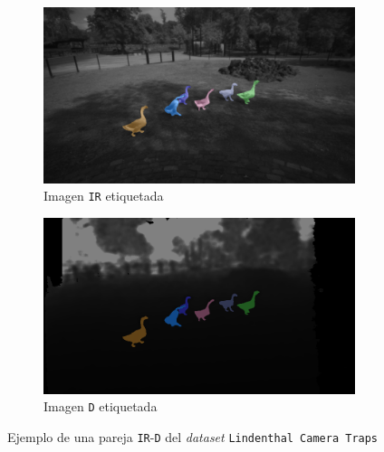 \documentclass[12pt,a4paper]{report}
\begin{document}
\begin{figure}
    \centering
    \begin{subfigure}{0.45\textwidth}
        \centering
        \includegraphics[width=\textwidth]{media/data/mask_gueese_ir.png}
        \caption{Imagen \texttt{IR} etiquetada}
    \end{subfigure}
    \hfill
    \begin{subfigure}{0.45\textwidth}
        \centering
        \includegraphics[width=\textwidth]{media/data/mask_gueese_de.png}
        \caption{Imagen \texttt{D} etiquetada}
    \end{subfigure}
    \caption{Ejemplo de una pareja \texttt{IR}-\texttt{D} del \textit{dataset} \texttt{Lindenthal Camera Traps}}
    \label{fig:tagged-example}
\end{figure}
\end{document}
